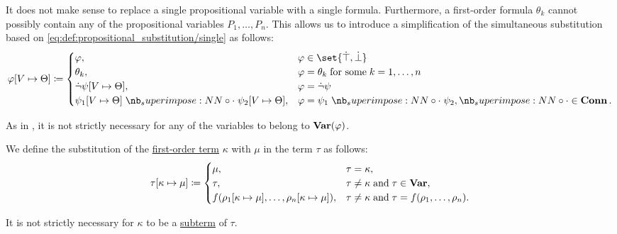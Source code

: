 \begin{definition}
\begin{thmenum}
    It does not make sense to replace a single propositional variable with a single formula. Furthermore, a first-order formula \( \theta_k \) cannot possibly contain any of the propositional variables \( P_1, \ldots, P_n \). This allows us to introduce a simplification of the simultaneous substitution based on \eqref{eq:def:propositional_substitution/single} as follows:
    \begin{equation}\label{eq:def:first_order_substitution/propositional}
      \varphi[V \mapsto \Theta] \coloneqq \begin{cases}
        \varphi,                                                    &\varphi \in \set{ \syntop, \synbot } \\
        \theta_k,                                                   &\varphi = \theta_k \T{for some} k = 1, \ldots, n \\
        \synneg \psi[V \mapsto \Theta],                                &\varphi = \synneg \psi \\
        \psi_1[V \mapsto \Theta] \syncirc \psi_2[V \mapsto \Theta], &\varphi = \psi_1 \syncirc \psi_2, {\syncirc} \in \op*{Conn}.
      \end{cases}
    \end{equation}

    As in , it is not strictly necessary for any of the variables to belong to \( \op*{Var}(\varphi) \).

     We define the substitution of the \hyperref[def:first_order_syntax/term]{first-order term} \( \kappa \) with \( \mu \) in the term \( \tau \) as follows:
    \begin{equation}\label{eq:def:first_order_substitution/term_in_term}
      \tau[\kappa \mapsto \mu] \coloneqq \begin{cases}
        \mu,                                                               &\tau = \kappa, \\
        \tau,                                                              &\tau \neq \kappa \T{and} \tau \in \op*{Var}, \\
        f(\rho_1[\kappa \mapsto \mu], \ldots, \rho_n[\kappa \mapsto \mu]), &\tau \neq \kappa \T{and} \tau = f(\rho_1, \ldots, \rho_n).
      \end{cases}
    \end{equation}

    It is not strictly necessary for \( \kappa \) to be a \hyperref[def:first_order_syntax/subterm]{subterm} of \( \tau \).


\end{thmenum}
\end{definition}
